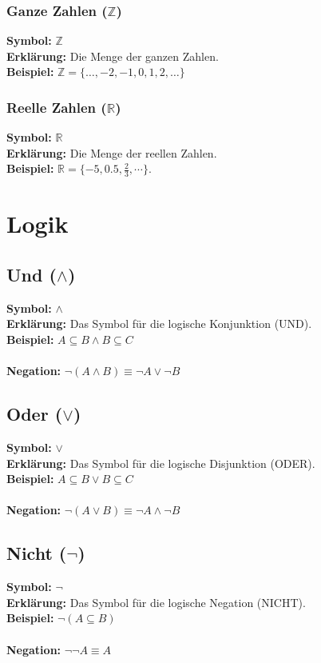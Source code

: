 \documentclass[12pt,a4paper]{article}
\begin{document}
\subsubsection{Ganze Zahlen (\texorpdfstring{$\mathbb{Z}$}{Z})}
\textbf{Symbol:} $\mathbb{Z}$ \\
\textbf{Erklärung:} Die Menge der ganzen Zahlen. \\
\textbf{Beispiel:} $\mathbb{Z} = \{\dots,-2,-1,0,1,2,\dots\}$

\subsubsection{Reelle Zahlen (\texorpdfstring{$\mathbb{R}$}{R})}
\textbf{Symbol:} $\mathbb{R}$ \\
\textbf{Erklärung:} Die Menge der reellen Zahlen. \\
\textbf{Beispiel:} $\mathbb{R} = \{-5, 0.5, \frac{2}{3}, \cdots\}$.

\section{Logik}

\subsection{Und (\texorpdfstring{$\land$}{land})}
\textbf{Symbol:} $\land$ \\
\textbf{Erklärung:} Das Symbol für die logische Konjunktion (UND). \\
\textbf{Beispiel:} $A \subseteq B \land B \subseteq C$ \\ \\
\textbf{Negation:} $\neg (A \land B) \equiv \neg A \lor \neg B$

\subsection{Oder (\texorpdfstring{$\lor$}{lor})}
\textbf{Symbol:} $\lor$ \\
\textbf{Erklärung:} Das Symbol für die logische Disjunktion (ODER). \\
\textbf{Beispiel:} $A \subseteq B \lor B \subseteq C$ \\ \\
\textbf{Negation:} $\neg (A \lor B) \equiv \neg A \land \neg B$

\subsection{Nicht (\texorpdfstring{$\neg$}{neg})}
\textbf{Symbol:} $\neg$ \\
\textbf{Erklärung:} Das Symbol für die logische Negation (NICHT). \\
\textbf{Beispiel:} $\neg (A \subseteq B)$ \\ \\
\textbf{Negation:} $\neg \neg A \equiv A$
\end{document}

